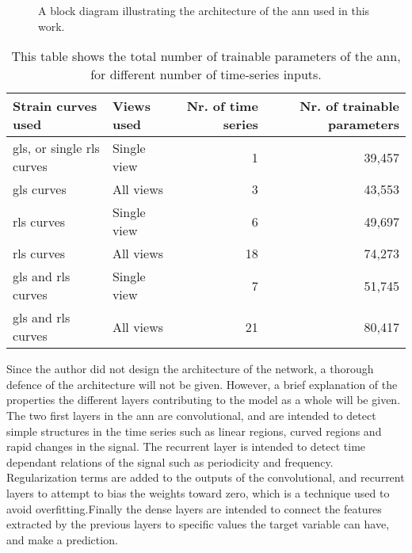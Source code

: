 \begin{figure}
    \centering
    
    \caption{A block diagram illustrating the architecture of the \acrshort{ann} used in this work.}
    \label{fig:nn_arch}
\end{figure}

\begin{table*}
    \centering
    \begin{tabular}{ llrr }
        \toprule
        Strain curves used                              & Views used  & Nr. of time series & Nr. of trainable parameters \\
        \midrule                                     
        \acrshort{gls}, or single \acrshort{rls} curves & Single view &         1          & 39,457 \\
        \acrshort{gls} curves                           &  All views  &         3          & 43,553 \\
        \acrshort{rls} curves                           & Single view &         6          & 49,697 \\
        \acrshort{rls} curves                           &  All views  &        18          & 74,273 \\
        \acrshort{gls} and \acrshort{rls} curves        & Single view &         7          & 51,745 \\
        \acrshort{gls} and \acrshort{rls} curves        &  All views  &        21          & 80,417 \\
        \bottomrule
    \end{tabular}
    \caption{This table shows the total number of trainable parameters of the \acrshort{ann}, for different number of time-series inputs.}
    \label{tab:train_params}
\end{table*}

Since the author did not design the architecture of the network, a thorough defence of the architecture will not be given. However, a brief explanation of the properties the different layers contributing to the model as a whole will be given. The two first layers in the \acrshort{ann} are convolutional, and are intended to detect simple structures in the time series such as linear regions, curved regions and rapid changes in the signal. The recurrent layer is intended to detect time dependant relations of the signal such as periodicity and frequency. Regularization terms are added to the outputs of the convolutional, and recurrent layers to attempt to bias the weights toward zero, which is a technique used to avoid overfitting.Finally the dense layers are intended to connect the features extracted by the previous layers to specific values the target variable can have, and make a prediction.

